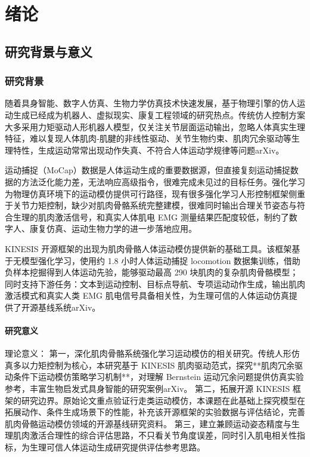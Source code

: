 \chapter{绪论}
\section{研究背景与意义}
\subsection{研究背景}
随着具身智能、数字人仿真、生物力学仿真技术快速发展，基于物理引擎的仿人运动生成已经成为机器人、虚拟现实、康复工程领域的研究热点。传统仿人控制方案大多采用力矩驱动人形机器人模型，仅关注关节层面运动输出，忽略人体真实生理特征，难以复现人体肌肉‑肌腱的非线性驱动、关节生物约束、肌肉冗余驱动等生理特性，生成运动常常出现动作失真、不符合人体运动学规律等问题arXiv。

运动捕捉（MoCap）数据是人体运动生成的重要数据源，但直接复刻运动捕捉数据的方法泛化能力差，无法响应高级指令，很难完成未见过的目标任务。强化学习为物理仿真环境下的运动模仿提供可行路径，现有很多强化学习人形控制框架侧重于关节力矩控制，缺少对肌肉骨骼系统完整建模，很难同时输出合理关节姿态与符合生理的肌肉激活信号，和真实人体肌电 EMG 测量结果匹配度较低，制约了数字人、康复仿真、运动生物力学的进一步落地应用。

KINESIS 开源框架的出现为肌肉骨骼人体运动模仿提供新的基础工具。该框架基于无模型强化学习，使用约 1.8 小时人体运动捕捉 locomotion 数据集训练，借助负样本挖掘得到人体运动先验，能够驱动最高 290 块肌肉的复杂肌肉骨骼模型；同时支持下游任务：文本到运动控制、目标点导航、专项运动动作生成，输出肌肉激活模式和真实人类 EMG 肌电信号具备相关性，为生理可信的人体运动仿真提供了开源基线系统arXiv。

\subsubsection{研究意义}
理论意义：
第一，深化肌肉骨骼系统强化学习运动模仿的相关研究。传统人形仿真多以力矩控制为核心，本研究基于 KINESIS 肌肉驱动范式，探究**肌肉冗余驱动条件下运动模仿策略学习机制**，对理解 Bernstein 运动冗余问题提供仿真实验参考，丰富生物启发式具身智能的研究案例arXiv。
第二，拓展开源 KINESIS 框架的研究边界。原始论文重点验证行走类运动模仿，本课题在此基础上探究模型在拓展动作、条件生成场景下的性能，补充该开源框架的实验数据与评估结论，完善肌肉骨骼运动模仿领域的开源基线研究资料。
第三，建立兼顾运动姿态精度与生理肌肉激活合理性的综合评估思路，不只看关节角度误差，同时引入肌电相关性指标，为生理可信人体运动生成研究提供评估参考思路。

